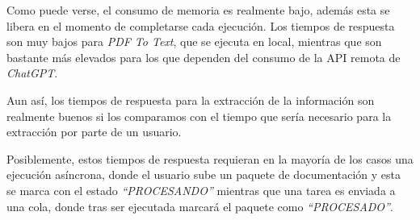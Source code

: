 Como puede verse, el consumo de memoria es realmente bajo, además esta se libera en el momento de completarse cada
ejecución.
Los tiempos de respuesta son muy bajos para \textit{PDF To Text}, que se ejecuta en local, mientras que son bastante
más elevados para los que dependen del consumo de la API remota de \textit{ChatGPT}.

Aun así, los tiempos de respuesta para la extracción de la información son realmente buenos si los comparamos con el
tiempo que sería necesario para la extracción por parte de un usuario.

Posiblemente, estos tiempos de respuesta requieran en la mayoría de los casos una ejecución asíncrona, donde el usuario
sube un paquete de documentación y esta se marca con el estado \textit{``PROCESANDO''} mientras que una tarea es
enviada a una cola, donde tras ser ejecutada marcará el paquete como \textit{``PROCESADO''}.
